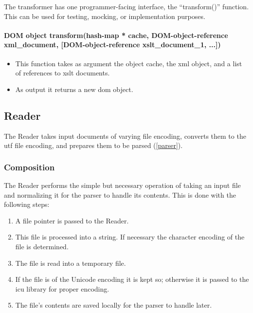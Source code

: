The transformer has one programmer-facing interface, the ``transform()'' function.
This can be used for testing, mocking, or implementation purposes.

\paragraph{DOM object transform(hash-map * cache, DOM-object-reference xml\_document, [DOM-object-reference xslt\_document\_1, ...])}

\begin{itemize}
	\item This function takes as argument the object cache, the \gls{xml} object, and a list of references to \gls{xslt} documents.
	\item As output it returns a new \gls{dom} object.
\end{itemize}

\subsection{Reader}
\label{reader}

The Reader takes input documents of varying file encoding, converts them to the \gls{utf} file encoding, and prepares them to be parsed (\ref{parser}). \cite{utf-8-standard} \cite{icu-library}

\subsubsection{Composition}

The Reader performs the simple but necessary operation of taking an input file and normalizing it for the parser to handle its contents.
This is done with the following steps:

\begin{enumerate}
	\item A file pointer is passed to the Reader.
    \item {
    	This file is processed into a string.
        If necessary the character encoding of the file is determined.
    }
    \item The file is read into a temporary file.
    \item If the file is of the Unicode encoding it is kept so; otherwise it is passed to the \gls{icu} library for proper encoding. \cite{icu-library}
    \item The file's contents are saved locally for the parser to handle later.
\end{enumerate}

